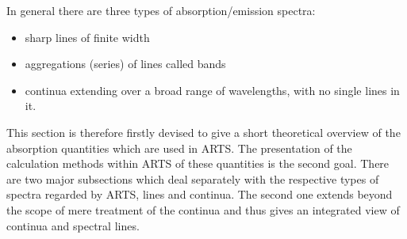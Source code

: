 \def\alphampmntot{\alpha^{\mbox{\rm \small MPM93}}_{\mbox{\small tot}}} 
\def\alphapwrtot{\alpha^{\mbox{\rm \small R98}}_{\mbox{\small tot}}} 
\def\alphacptot{\alpha^{\mbox{\rm \small CP98}}_{\mbox{\small tot}}} 
%
\def\alphampmol{\alpha^{\mbox{\rm \small MPM87}}_{\mbox{\small $\ell$}}} 
\def\alphampmml{\alpha^{\mbox{\rm \small MPM89}}_{\mbox{\small $\ell$}}} 
\def\alphampmnl{\alpha^{\mbox{\rm \small MPM93}}_{\mbox{\small $\ell$}}} 
\def\alphampml{\alpha^{\mbox{\rm \small MPM}}_{\mbox{\small $\ell$}}} 
\def\alphapwrl{\alpha^{\mbox{\rm \small R98}}_{\mbox{\small $\ell$}}} 
\def\alphacpl{\alpha^{\mbox{\rm \small CP98}}_{\mbox{\small $\ell$}}} 
%
\def\alphampmoc{\alpha^{\mbox{\rm \small MPM87}}_{\rm c}} 
\def\alphampmmc{\alpha^{\mbox{\rm \small MPM89}}_{\rm c}} 
\def\alphampmnc{\alpha^{\mbox{\rm \small MPM93}}_{\rm c}} 
\def\alphapwrc{\alpha^{\mbox{\rm \small R98}}_{\rm c}} 
\def\alphacpc{\alpha^{\mbox{\rm \small CP98}}_{\rm c}} 
%
\def\gamk{\gamma_{\mbox{\rm \small k}}}
\def\gamc{\gamma_{\mbox{\rm \small c}}}
%
\def\ws{w_{\mbox{\rm \small s,k}}}
\def\xs{x_{\mbox{\rm \small s,k}}}
\def\wf{w_{\mbox{\rm \small f,k}}}
\def\xf{x_{\mbox{\rm \small f,k}}}
%
\def\wn{\bar{\nu}}
\def\nucc{\nu_{\mbox{\rm \small c}}}
\def\nucut{\nu_{\mbox{\rm \small cutoff}}}
\def\nuo{\nu_{\mbox{\rm \small 0}}}
\def\nuk{\nu_{\mbox{\rm \small k}}}
%
\def\shape{F(\nu,\nuk)}
\def\shapec{F_{c}(\nu,\nuk)}
\def\shapefp{f_{c}(\nu,+\nuk)}
\def\shapefm{f_{c}(\nu,-\nuk)}
\def\shapefpm{f_{c}(\nu,\pm\nuk)}
\def\inten{S_{\mbox{\rm \small k}}(T)}
\def\inteno{S_{\mbox{\rm \small k}}(300\,K)}
\def\intencp{S_{\mbox{\rm \small 0}}(T)}
%
\def\cx{C_{\mbox{\rm \small x}}}
\def\cs{C_{\mbox{\rm \small H}_{2}\mbox{\rm \small O}}} 
\def\cf{C_{\mbox{\rm N}_{2}}} 
\def\cxo{C^{\mbox{\rm o}}_{\mbox{\rm \small X}}} 
\def\cso{C^{\mbox{\rm o}}_{\mbox{\rm \small H}_{2}\mbox{\rm \small O}}} 
\def\cfo{C^{\mbox{\rm o}}_{\mbox{\rm \small N}_{2}}} 
\def\cao{C^{\mbox{\rm o}}_{\mbox{\rm \small air}}}
\def\cdo{C^{\mbox{\rm o}}_{\mbox{\rm \small d}}}
\def\xx{{\rm n}_{\mbox{\rm \small  x}}} 
\def\xs{{\rm n}_{\mbox{\rm \small  s}}} 
\def\xf{{\rm n}_{\mbox{\rm \small  f}}} 
\def\xd{{\rm n}_{\mbox{\rm \small  d}}}
%


                                          

In general there are three types of absorption/emission spectra:
\begin{itemize}
\item sharp lines of finite width
\item aggregations (series) of lines called bands
\item continua extending over a broad range of wavelengths, with
      no single lines in it.
\end{itemize}
This section is therefore firstly devised to give a short theoretical
overview of the absorption quantities which are used in ARTS. The
presentation of the calculation methods within ARTS of these
quantities is the second goal. There are two major subsections which
deal separately with the respective types of spectra regarded by ARTS,
lines and continua.  The second one extends beyond the scope of mere
treatment of the continua and thus gives an integrated view of
continua and spectral lines.

